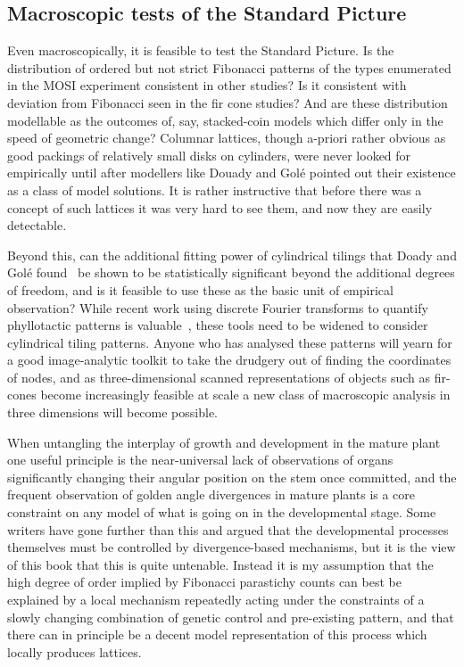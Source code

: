\subsection{Macroscopic tests of the Standard Picture}
Even macroscopically, it is feasible to test the Standard Picture. Is the distribution of ordered but not strict Fibonacci patterns of the types enumerated in the MOSI experiment consistent in other studies? Is it consistent with deviation from Fibonacci seen in the fir cone studies? And are these distribution modellable as the outcomes of, say, stacked-coin models which differ only in the speed of geometric change? 
Columnar lattices, though a-priori rather obvious as good packings of relatively small disks on cylinders, were never looked for empirically until after modellers like Douady and Golé pointed out their existence as a class of model solutions. It is rather instructive that before there was a concept of such lattices it was very hard to see them, and now they are easily detectable. 


Beyond this, can the additional fitting power of cylindrical tilings that Doady and Golé found~\cite{douadyFibonacciQuasisymmetricPhyllotaxis2016} be shown to be statistically significant beyond the additional degrees of freedom, and is it feasible to use these as the basic unit of empirical observation? While recent work using discrete Fourier transforms to quantify phyllotactic patterns is valuable~\cite{negishiDeterminingParastichyPairs2022}, these tools need to be widened to consider cylindrical tiling patterns. Anyone who has analysed these patterns will yearn for a good image-analytic toolkit to take the drudgery out of finding the coordinates of nodes, and as three-dimensional scanned representations of objects such as fir-cones become increasingly feasible at scale a new class of macroscopic analysis in three dimensions will become possible. 
 

When untangling the interplay of growth and development in the mature plant one useful principle is the near-universal lack of observations of organs significantly changing their angular position on the stem once committed, and the frequent observation of golden angle divergences in mature plants is a core constraint on any model of what is going on in the developmental stage. Some writers have gone further than this and argued that the developmental processes themselves must be controlled by divergence-based mechanisms, but it is the view of this book that this is quite untenable.  Instead it is my assumption that the high degree of order implied by Fibonacci parastichy counts can best be explained by a local mechanism repeatedly acting under the constraints of a slowly changing combination of genetic control and pre-existing pattern, and that there can in principle be a decent model representation of this process which locally produces lattices. 

